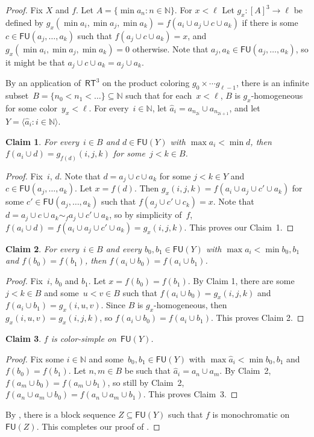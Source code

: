 \documentclass[10pt,a4paper]{article}
\newcommand{\RT}[0]{\mathsf{RT}}
\newcommand{\NN}[0]{\mathbb{N}}
\newcommand{\FU}[0]{\mathsf{FU}} %
\numberwithin{theorem}{section}
\newtheorem{claim}{Claim}
\begin{document}
\begin{proof}
Fix $X$ and $f$.
Let $A = \{ \min a_n : n \in \NN \}$. For $x < \ell$ Let $g_x : [A]^3 \to \ell$ be defined by $g_x(\min a_i, \min a_j, \min a_k) = f(a_i \cup a_j \cup c \cup a_k)$ if there is some~$c \in \FU(a_j, \dots, a_k)$ such that $f(a_j \cup c \cup a_k) = x$, and $g_x(\min a_i, \min a_j, \min a_k) = 0$ otherwise. Note that $a_j, a_k \in \FU(a_j, \dots, a_k)$, so it might be that $a_j \cup c \cup a_k = a_j \cup a_k$.

By an application of~$\RT^3$ on the product coloring $g_0 \times \cdots g_{\ell-1}$, there is an infinite subset~$B = \{ n_0 < n_1 < \dots \} \subseteq \NN$ such that for each~$x < \ell$, $B$ is $g_x$-homogeneous for some color~$y_x < \ell$. For every~$i \in \NN$, let $\hat a_i = a_{n_{2i}} \cup a_{n_{2i+1}}$, and let $Y = \langle \hat a_i : i \in \NN \rangle$.

\begin{claim}
For every~$i \in B$ and $d \in \FU(Y)$ with $\max a_i < \min d$, then $f(a_i \cup d) = g_{f(d)}(i, j, k)$ for some~$j < k \in B$.
\end{claim}
\begin{proof}
Fix~$i$, $d$. Note that $d = a_j \cup c \cup a_k$ for some $j < k \in Y$ and $c \in \FU(a_j, \dots, a_k)$. Let $x = f(d)$. Then $g_x(i, j, k) = f(a_i \cup a_j \cup c' \cup a_k)$ for some $c' \in \FU(a_j, \dots, a_k)$ such that $f(a_j \cup c' \cup c_k) = x$. Note that $d = a_j \cup c \cup a_k \sim_f a_j \cup c' \cup a_k$,
so by simplicity of~$f$, $f(a_i \cup d) = f(a_i \cup a_j \cup c' \cup a_k) = g_x(i, j, k)$. This proves our Claim~1.
\end{proof}

\begin{claim}
For every~$i \in B$ and every $b_0, b_1 \in \FU(Y)$ with $\max a_i < \min b_0, b_1$ and $f(b_0) = f(b_1)$, then $f(a_i \cup b_0) = f(a_i \cup b_1)$.
\end{claim}
\begin{proof}
Fix~$i$, $b_0$ and $b_1$. Let $x = f(b_0) = f(b_1)$. By Claim 1, there are some~$j < k \in B$ and some~$u < v \in B$ such that $f(a_i \cup b_0) = g_x(i, j, k)$ and $f(a_i \cup b_1) = g_x(i, u, v)$. Since $B$ is $g_x$-homogeneous, then $g_x(i, u, v) = g_x(i, j, k)$, so $f(a_i \cup b_0) = f(a_i \cup b_1)$. This proves Claim 2.
\end{proof}

\begin{claim}
$f$ is color-simple on~$\FU(Y)$.
\end{claim}
\begin{proof}
Fix some $i \in \NN$ and some~$b_0, b_1 \in \FU(Y)$ with $\max \hat a_i < \min b_0, b_1$ and $f(b_0) = f(b_1)$.
Let $n, m \in B$ be such that $\hat a_i = a_n \cup a_m$. By Claim~2, $f(a_m \cup b_0) = f(a_m \cup b_1)$, so still by Claim~2, $f(a_n \cup a_m \cup b_0) = f(a_n \cup a_m \cup b_1)$. This proves Claim~3.
\end{proof}

By , there is a block sequence $Z \subseteq \FU(Y)$ such that $f$ is monochromatic on~$\FU(Z)$. This completes our proof of .
\end{proof}





\end{document}

